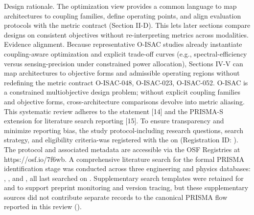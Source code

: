{}
\markdownRendererSectionEnd \markdownRendererSectionBegin
{}\markdownRendererInterblockSeparator
{}Design rationale. The optimization view provides a common language to map architectures to coupling families, define operating points, and align evaluation protocols with the metric contract (Section II-D). This lets later sections compare designs on consistent objectives without re-interpreting metrics across modalities.\markdownRendererParagraphSeparator
{}Evidence alignment. Because representative O-ISAC studies already instantiate coupling-aware optimization and explicit trade-off curves (e.g., spectral-efficiency versus sensing-precision under constrained power allocation), Sections IV-V can map architectures to objective forms and admissible operating regions without redefining the metric contract O-ISAC-048, O-ISAC-023, O-ISAC-052.\markdownRendererParagraphSeparator
{} O-ISAC is a constrained multiobjective design problem; without explicit coupling families and objective forms, cross-architecture comparisons devolve into metric aliasing.\markdownRendererInterblockSeparator
{}
\markdownRendererSectionEnd 
\markdownRendererSectionEnd 
\markdownRendererSectionEnd \markdownRendererSectionBegin
{}\markdownRendererInterblockSeparator
{}\markdownRendererSectionBegin
{}\markdownRendererInterblockSeparator
{}This systematic review adheres to the  statement [14] and the PRISMA-S extension for literature search reporting [15]. To ensure transparency and minimize reporting bias, the study protocol-including research questions, search strategy, and eligibility criteria-was registered with the  on  (Registration ID: ). The protocol and associated metadata are accessible via the OSF Registries at https://osf.io/7f6wb.\markdownRendererInterblockSeparator
{}
\markdownRendererSectionEnd \markdownRendererSectionBegin
{}\markdownRendererInterblockSeparator
{}A comprehensive literature search for the formal PRISMA identification stage was conducted across three engineering and physics databases: , , and , all last searched on . Supplementary search templates were retained for  and  to support preprint monitoring and version tracing, but these supplementary sources did not contribute separate records to the canonical PRISMA flow reported in this review ().\markdownRendererParagraphSeparator
